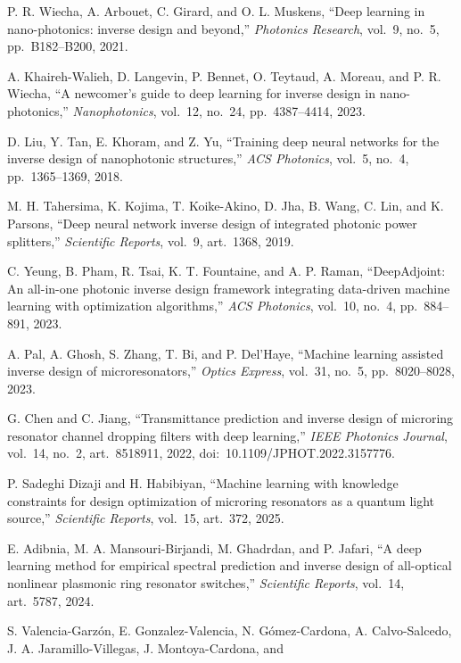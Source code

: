 \documentclass[11pt]{article}
\begin{document}
\begingroup\sloppy
\begin{enumerate}[label={[\arabic*]},leftmargin=2.2em,itemsep=3pt]
\item P. R. Wiecha, A. Arbouet, C. Girard, and O. L. Muskens, ``Deep learning
in nano-photonics: inverse design and beyond,'' \emph{Photonics Research},
vol.~9, no.~5, pp.~B182--B200, 2021.
\item A. Khaireh-Walieh, D. Langevin, P. Bennet, O. Teytaud, A. Moreau, and
P. R. Wiecha, ``A newcomer's guide to deep learning for inverse design in
nano-photonics,'' \emph{Nanophotonics}, vol.~12, no.~24, pp.~4387--4414, 2023.
\item D. Liu, Y. Tan, E. Khoram, and Z. Yu, ``Training deep neural networks for
the inverse design of nanophotonic structures,'' \emph{ACS Photonics}, vol.~5,
no.~4, pp.~1365--1369, 2018.
\item M. H. Tahersima, K. Kojima, T. Koike-Akino, D. Jha, B. Wang, C. Lin, and
K. Parsons, ``Deep neural network inverse design of integrated photonic power
splitters,'' \emph{Scientific Reports}, vol.~9, art.~1368, 2019.
\item C. Yeung, B. Pham, R. Tsai, K. T. Fountaine, and A. P. Raman,
``DeepAdjoint: An all-in-one photonic inverse design framework integrating
data-driven machine learning with optimization algorithms,'' \emph{ACS
Photonics}, vol.~10, no.~4, pp.~884--891, 2023.
\item A. Pal, A. Ghosh, S. Zhang, T. Bi, and P. Del'Haye, ``Machine learning
assisted inverse design of microresonators,'' \emph{Optics Express}, vol.~31,
no.~5, pp.~8020--8028, 2023.
\item G. Chen and C. Jiang, ``Transmittance prediction and inverse design of
microring resonator channel dropping filters with deep learning,'' \emph{IEEE
Photonics Journal}, vol.~14, no.~2, art.~8518911, 2022,
doi:~10.1109/JPHOT.2022.3157776.
\item P. Sadeghi Dizaji and H. Habibiyan, ``Machine learning with knowledge
constraints for design optimization of microring resonators as a quantum light
source,'' \emph{Scientific Reports}, vol.~15, art.~372, 2025.
\item E. Adibnia, M. A. Mansouri-Birjandi, M. Ghadrdan, and P. Jafari, ``A deep
learning method for empirical spectral prediction and inverse design of
all-optical nonlinear plasmonic ring resonator switches,'' \emph{Scientific
Reports}, vol.~14, art.~5787, 2024.
\item S. Valencia-Garz\'on, E. Gonzalez-Valencia, N. G\'omez-Cardona,
A. Calvo-Salcedo, J. A. Jaramillo-Villegas, J. Montoya-Cardona, and

\end{enumerate}
\end{document}
